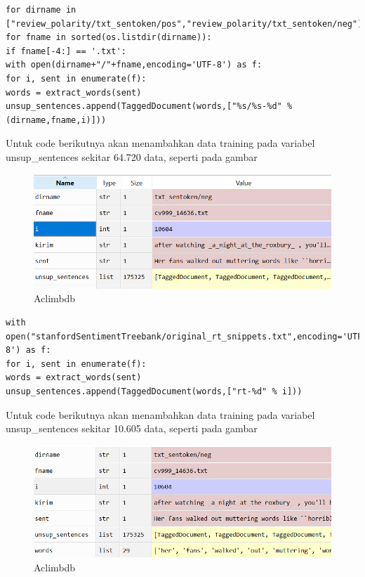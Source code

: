 \begin{enumerate}
\begin{verbatim}
for dirname in ["review_polarity/txt_sentoken/pos","review_polarity/txt_sentoken/neg"]:
for fname in sorted(os.listdir(dirname)):
if fname[-4:] == '.txt':
with open(dirname+"/"+fname,encoding='UTF-8') as f:
for i, sent in enumerate(f):
words = extract_words(sent)
unsup_sentences.append(TaggedDocument(words,["%s/%s-%d" % (dirname,fname,i)]))
\end{verbatim}
\subitem Untuk code berikutnya akan menambahkan data training pada variabel unsup\_sentences sekitar 64.720 data, seperti pada gambar 
\begin{figure}[!htbp]
	\centerline{\includegraphics[width=1\textwidth]{figures/andi/T3.PNG}}
	\caption{Aclimbdb}
\end{figure}

\begin{verbatim}
with open("stanfordSentimentTreebank/original_rt_snippets.txt",encoding='UTF-8') as f:
for i, sent in enumerate(f):
words = extract_words(sent)
unsup_sentences.append(TaggedDocument(words,["rt-%d" % i]))
\end{verbatim}
\subitem Untuk code berikutnya akan menambahkan data training pada variabel unsup\_sentences sekitar 10.605 data, seperti pada gambar 
\begin{figure}[!htbp]
	\centerline{\includegraphics[width=1\textwidth]{figures/andi/T4.PNG}}
	\caption{Aclimbdb}
\end{figure}


\end{enumerate}
